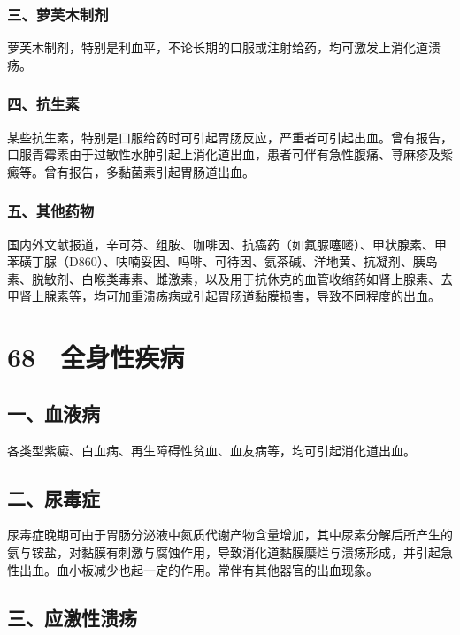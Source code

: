 \subsubsection{三、萝芙木制剂}

萝芙木制剂，特别是利血平，不论长期的口服或注射给药，均可激发上消化道溃疡。

\subsubsection{四、抗生素}

某些抗生素，特别是口服给药时可引起胃肠反应，严重者可引起出血。曾有报告，口服青霉素由于过敏性水肿引起上消化道出血，患者可伴有急性腹痛、荨麻疹及紫癜等。曾有报告，多黏菌素引起胃肠道出血。

\subsubsection{五、其他药物}

国内外文献报道，辛可芬、组胺、咖啡因、抗癌药（如氟脲噻嘧）、甲状腺素、甲苯磺丁脲（D860）、呋喃妥因、吗啡、可待因、氨茶碱、洋地黄、抗凝剂、胰岛素、脱敏剂、白喉类毒素、雌激素，以及用于抗休克的血管收缩药如肾上腺素、去甲肾上腺素等，均可加重溃疡病或引起胃肠道黏膜损害，导致不同程度的出血。

\protect\hypertarget{text00171.html}{}{}

\section{68　全身性疾病}

\subsection{一、血液病}

各类型紫癜、白血病、再生障碍性贫血、血友病等，均可引起消化道出血。

\subsection{二、尿毒症}

尿毒症晚期可由于胃肠分泌液中氮质代谢产物含量增加，其中尿素分解后所产生的氨与铵盐，对黏膜有刺激与腐蚀作用，导致消化道黏膜糜烂与溃疡形成，并引起急性出血。血小板减少也起一定的作用。常伴有其他器官的出血现象。

\subsection{三、应激性溃疡}

